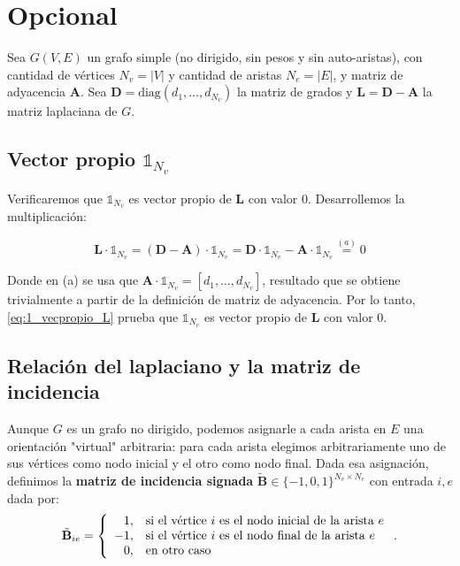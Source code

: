 \documentclass{article}
\begin{document}
\section{Opcional}

\newcommand{\ones}[1]{\mathbb{1}_{#1}}
\newcommand{\lap}{\mathbf{L}}
\newcommand{\diag}{\mathbf{D}}
\newcommand{\adj}{\mathbf{A}}
\newcommand{\bm}{\tilde{\mathbf{B}}}
\newcommand{\x}{\mathbf{x}}

Sea $G(V,E)$ un grafo simple (no dirigido, sin pesos y sin auto-aristas), con cantidad de vértices $N_v = |V|$ y cantidad de aristas $N_e = |E|$, y matriz de adyacencia $\mathbf{A}$. Sea $\mathbf{D} = \text{diag}(d_{1},\dots, d_{N_v})$ la matriz de grados y $\mathbf{L}=\mathbf{D}- \mathbf{A}$ la matriz laplaciana de $G$.
 
\subsection{Vector propio $\ones{N_v}$}
\label{subsec:vector_propio_1}

Verificaremos que $\ones{N_v}$ es vector propio de $\lap$ con valor 0. Desarrollemos la multiplicación:

\begin{equation}
    \lap \cdot \ones{N_v} = (\diag - \adj) \cdot \ones{N_v}  = \diag \cdot \ones{N_v} - \adj \cdot \ones{N_v} \stackrel{(a)}{=} 0
    \label{eq:1_vecpropio_L}
\end{equation}

Donde en (a) se usa que $\adj \cdot \ones{N_v} = [d_1, \dots, d_{N_v}]$, resultado que
se obtiene trivialmente a partir de la definición de matriz de adyacencia. 
Por lo tanto, \eqref{eq:1_vecpropio_L} prueba que $\ones{N_v}$ es vector propio de $\lap$ con valor 0.

\subsection{Relación del laplaciano y la matriz de incidencia}

Aunque $G$ es un grafo no dirigido, podemos asignarle a cada arista en $E$ una orientación "virtual" arbitraria: para cada arista elegimos arbitrariamente uno de sus vértices como nodo inicial y el otro como nodo final. Dada esa asignación, definimos la \textbf{matriz de incidencia signada} $\bm \in \{-1,0,1\}^{N_v\times N_e}$ con entrada $i,e$ dada por:
\begin{equation}
    \bm_{ie} = \left\lbrace
    \begin{array}{r l}
    1,& \text{si el vértice } i \text{ es el nodo inicial de la arista } e\\
    -1,& \text{si el vértice } i \text{ es el nodo final de la arista } e\\
    0,& \text{en otro caso}
    \end{array}
    \right. .
    \label{eq:matrix_incidencia}
\end{equation}
\end{document}

